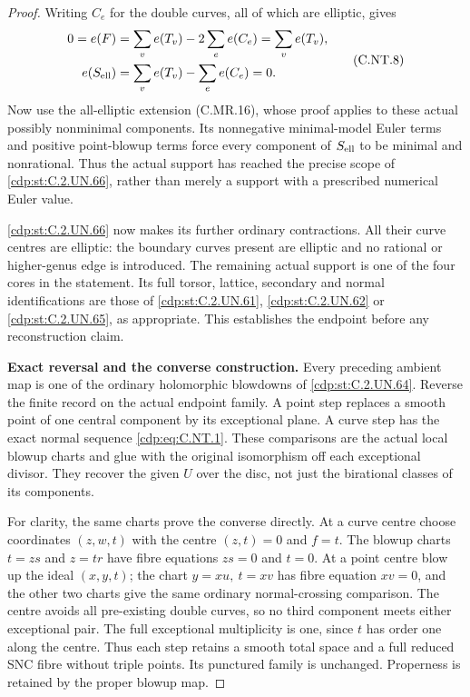 \begin{proof}
Writing $C_e$ for the double curves, all of which
are elliptic, gives
\[
 \begin{split}
 0=e(F)&=\sum_v e(T_v)-2\sum_e e(C_e)
                            =\sum_v e(T_v),\\
 e(S_{\rm ell})&=\sum_v e(T_v)-\sum_e e(C_e)=0.
 \end{split}
\tag{C.NT.8}\label{cdp:eq:C.NT.8}
\]
Now use the all-elliptic extension (C.MR.16), whose
proof applies to these actual possibly nonminimal
components. Its nonnegative minimal-model Euler
terms and positive point-blowup terms force every
component of $S_{\rm ell}$ to be minimal and
nonrational. Thus the actual support has reached
the precise scope of \ref{cdp:st:C.2.UN.66}, rather than merely a
support with a prescribed numerical Euler value.

\ref{cdp:st:C.2.UN.66} now makes its further ordinary contractions.
All their curve centres are elliptic: the boundary
curves present are elliptic and no rational or
higher-genus edge is introduced. The remaining
actual support is one of the four cores in the
statement. Its full torsor, lattice, secondary and
normal identifications are those of \ref{cdp:st:C.2.UN.61}, \ref{cdp:st:C.2.UN.62}
or \ref{cdp:st:C.2.UN.65}, as appropriate. This establishes the
endpoint before any reconstruction claim.

\par\medskip\noindent\textbf{Exact reversal and the converse construction.}
Every preceding ambient map is one of the ordinary
holomorphic blowdowns of \ref{cdp:st:C.2.UN.64}. Reverse the finite
record on the actual endpoint family. A point
step replaces a smooth point of one central
component by its exceptional plane. A curve
step has the exact normal sequence \eqref{cdp:eq:C.NT.1}.
These comparisons are the actual local blowup
charts and glue with the original isomorphism
off each exceptional divisor. They recover the
given $U$ over the disc, not just the birational
classes of its components.

For clarity, the same charts prove the converse
directly. At a curve centre choose coordinates
$(z,w,t)$ with the centre $(z,t)=0$ and $f=t$.
The blowup charts $t=zs$ and $z=tr$ have fibre
equations $zs=0$ and $t=0$. At a point centre
blow up the ideal $(x,y,t)$; the chart
$y=xu,\ t=xv$ has fibre equation $xv=0$,
and the other two charts give the same ordinary
normal-crossing comparison. The centre avoids
all pre-existing double curves, so no third
component meets either exceptional pair.
The full exceptional multiplicity is one, since
$t$ has order one along the centre.
Thus each step retains a smooth total space
and a full reduced SNC fibre without triple points.
Its punctured family is unchanged. Properness
is retained by the proper blowup map.


\end{proof}

